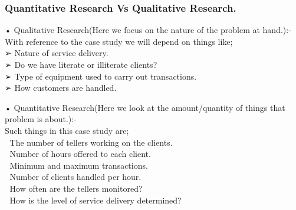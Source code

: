 \documentclass[10pt,a4paper]{report}
\begin{document}
\begin{flushleft}
\subsubsection*{ Quantitative Research Vs Qualitative Research.}

\begin{flushleft}

•	Qualitative Research(Here we focus on the nature of the problem at hand.):-\\
With reference to the case study we will depend on things like;\\
➢	Nature of service delivery.\\
➢	Do we have literate or illiterate clients?\\
➢	Type of equipment used to carry out transactions.\\
➢	How customers are handled.\\

\end{flushleft}


•	Quantitative Research(Here we look at the amount/quantity of things that problem is about.):-\\
Such things in this case study are;\\

	The number of tellers working on the clients.\\
	Number of hours offered to each client.\\
	Minimum and maximum transactions.\\
	Number of clients handled per hour.\\
	How often are the tellers monitored?\\
	How is the level of service delivery determined?\\


	\end{flushleft}
\end{document}
